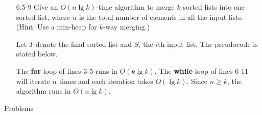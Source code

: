 \documentclass{report}
\makeatletter
\renewenvironment{framed}{%
 \def\FrameCommand##1{\hskip\@totalleftmargin
 \fboxsep=\FrameSep\fbox{##1}}%
 \MakeFramed {\advance\hsize-\width
   \@totalleftmargin\z@ \linewidth\hsize
   \@setminipage}}%
 {\par\unskip\endMakeFramed}
\makeatother
\begin{document}
\begin{enumerate}
\item[6.5{-}9]{Give an $O(n \lg k)$-time algorithm to merge $k$ sorted lists
into one sorted list, where $n$ is the total number of elements in all the input
lists. (Hint: Use a min-heap for $k$-way merging.)}

\begin{framed}
Let $T$ denote the final sorted list and $S_i$ the $i$th input list. The
pseudocode is stated below.

\begin{algorithm}[H]
\SetAlgoNoEnd\DontPrintSemicolon
\BlankLine
{}
\end{algorithm}

The \textbf{for} loop of lines 3{-}5 runs in $O(k \lg k)$. The \textbf{while}
loop of lines 6{-}11 will iterate $n$ times and each iteration takes $O(\lg k)$.
Since $n \ge k$, the algorithm runs in $O(n \lg k)$.
\end{framed}

\end{enumerate}

\newpage

{\large Problems}
\end{document}
